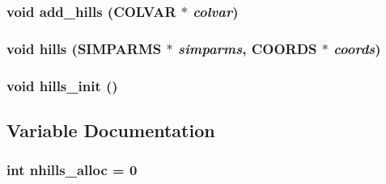 \subsubsection{\setlength{\rightskip}{0pt plus 5cm}void add\_\-hills ({\bf COLVAR} $\ast$ {\em colvar})}\label{hills_8c_eeed85c37ce6adb67a3aa6b0525febb3}


\subsubsection{\setlength{\rightskip}{0pt plus 5cm}void hills ({\bf SIMPARMS} $\ast$ {\em simparms}, {\bf COORDS} $\ast$ {\em coords})}\label{hills_8c_31ba0db42c93656d34b74475d6fc2797}


\subsubsection{\setlength{\rightskip}{0pt plus 5cm}void hills\_\-init ()}\label{hills_8c_9e7572e86539bd4470dddef14dd63407}




\subsection{Variable Documentation}
\subsubsection{\setlength{\rightskip}{0pt plus 5cm}int {\bf nhills\_\-alloc} = 0\hspace{0.3cm}{\tt  [static]}}\label{hills_8c_b225f9fbe96553fdc862ef5c53412f5e}


